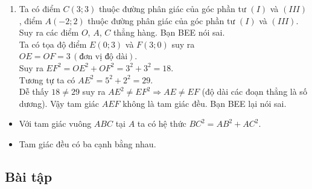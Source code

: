 \begin{vd}
{\begin{enumerate}
{	
	}
	\item Ta có điểm $C\left(3; 3\right)$ thuộc đường phân giác của góc phần tư $\left(I\right)$ và $\left(III\right)$, điểm $A\left(- 2; 2\right)$ thuộc đường phân giác của góc phần tư $\left(I\right)$ và $\left(III\right)$. Suy ra các điểm $O$, $A$, $C$ thẳng hàng. Bạn BEE nói sai.\\
			Ta có tọa độ điểm $E\left(0; 3\right)$ và $F\left(3; 0\right)$ suy ra $OE = OF = 3\,  (\text{đơn vị độ dài})$.\\
			Suy ra $EF^2 = OE^2 + OF^2 = 3^2 + 3^2 = 18$.\\
			Tương tự ta có $AE^2 = 5^2 + 2^2 = 29$.\\
			Dễ thấy $18\neq 29$ suy ra $AE^2\neq EF^2\Rightarrow AE\neq EF$ (độ dài các đoạn thẳng là số dương). Vậy tam giác $AEF$ không là tam giác đều. Bạn BEE lại nói sai.
	\end{enumerate}		
}
\end{vd}
\begin{note}
	\begin{itemize}
	\item Với tam giác vuông $ABC$ tại $A$ ta có hệ thức $BC^2 = AB^2 + AC^2$.
	\item Tam giác đều có ba cạnh bằng nhau. 
\end{itemize}
\end{note}
\subsection{Bài tập}
